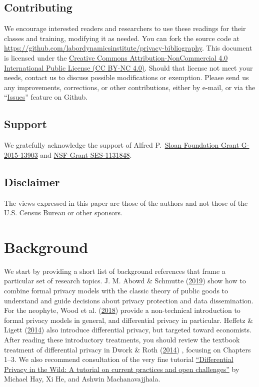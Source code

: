 \documentclass[]{article}
\begin{document}
\subsection{Contributing}\label{contributing}

We encourage interested readers and researchers to use these readings
for their classes and training, modifying it as needed. You can fork the
source code at
\url{https://github.com/labordynamicsinstitute/privacy-bibliography}.
This document is licensed under the
\href{https://creativecommons.org/licenses/by-nc/4.0/}{Creative Commons
Attribution-NonCommercial 4.0 International Public License (CC BY-NC
4.0)}. Should that license not meet your needs, contact us to discuss
possible modifications or exemption. Please send us any improvements,
corrections, or other contributions, either by e-mail, or via the
``\href{https://github.com/labordynamicsinstitute/privacy-bibliography/issues}{Issues}''
feature on Github.

\subsection{Support}\label{support}

We gratefully acknowledge the support of Alfred
P.~\href{https://sloan.org/grant-detail/6845}{Sloan Foundation Grant
G-2015-13903} and
\href{http://www.nsf.gov/awardsearch/showAward.do?AwardNumber=1131848}{NSF
Grant SES-1131848}.

\subsection{Disclaimer}\label{disclaimer}

The views expressed in this paper are those of the authors and not those
of the U.S. Census Bureau or other sponsors.

\section{Background}\label{background}

We start by providing a short list of background references that frame a
particular set of research topics. J. M. Abowd \& Schmutte
(\protect\hyperlink{ref-AbowdSchmutte:Privacy:AER}{2019}) show how to
combine formal privacy models with the classic theory of public goods to
understand and guide decisions about privacy protection and data
dissemination. For the neophyte, Wood et al.
(\protect\hyperlink{ref-WoodVanderbiltJ.Entertain.Technol.Law2018}{2018})
provide a non-technical introduction to formal privacy models in
general, and differential privacy in particular. Heffetz \& Ligett
(\protect\hyperlink{ref-Heffetz2014}{2014}) also introduce differential
privacy, but targeted toward economists. After reading these
introductory treatments, you should review the textbook treatment of
differential privacy in Dwork \& Roth
(\protect\hyperlink{ref-Dwork:Roth:journal:version:2014}{2014}) ,
focusing on Chapters 1--3. We also recommend consultation of the very
fine tutorial
\href{https://users.cs.duke.edu/~ashwin/index.html\#tutorials}{``Differential
Privacy in the Wild: A tutorial on current practices and open
challenges''} by Michael Hay, Xi He, and Ashwin Machanavajjhala.
\end{document}
